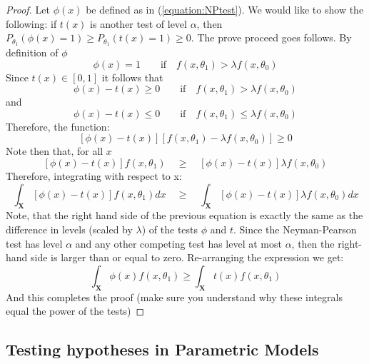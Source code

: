 \documentclass[11pt]{article} %
\begin{document}
\begin{proof}
Let $\phi(x)$ be defined as in (\ref{equation:NPtest}). We would like to show the following: if $t(x)$ is another test of level $\alpha$, then $P_{\theta_1} (\phi(x)=1) \geq P_{\theta_1} (t(x)=1) \geq 0$. The prove proceed goes follows. By definition of $\phi$
\begin{equation*}
\phi(x)=1 \quad\quad \text{if}  \quad f(x, \theta_1) > \lambda f(x, \theta_0)
 \end{equation*} 
Since $t(x) \in [0,1]$ it follows that 
\begin{equation*}
\phi(x) - t(x) \geq 0 \quad\quad \text{if}  \quad f(x, \theta_1) > \lambda f(x, \theta_0)
 \end{equation*} 
 and
 \begin{equation*}
\phi(x) - t(x) \leq 0 \quad\quad \text{if}  \quad f(x, \theta_1) \leq \lambda f(x, \theta_0)
 \end{equation*} 
 Therefore, the function:
 \begin{equation*}
\left[ \phi(x)-t(x) \right] \left[ f(x, \theta_1) - \lambda f(x, \theta_0) \right] \geq 0
 \end{equation*}
 Note then that, for all $x$
 \begin{equation*}
 \left[ \phi(x)-t(x) \right] f(x, \theta_1) \quad \geq  \quad \left[ \phi(x)-t(x) \right] \lambda f(x, \theta_0) 
 \end{equation*}
 Therefore, integrating with respect to x:
  \begin{equation*}
\int_{\mathbf{X}} \left[ \phi(x)-t(x) \right] f(x, \theta_1)dx \quad \geq  \quad \int_{\mathbf{X}}\left[ \phi(x)-t(x) \right] \lambda f(x, \theta_0) dx
 \end{equation*}
 Note, that the right hand side of the previous equation is exactly the same as the difference in levels (scaled by $\lambda$) of the tests $\phi$ and $t$. Since the Neyman-Pearson test has level $\alpha$ and any other competing test has level at most $\alpha$, then the right-hand side is larger than or equal to zero.  Re-arranging the expression we get:
 \begin{equation*}
 \int_{\mathbf{X}} \phi(x) f(x, \theta_1) \geq  \int_{\mathbf{X}} t(x) f(x, \theta_1)
 \end{equation*}
 And this completes the proof (make sure you understand why these integrals equal the power of the tests)
\end{proof}

\subsection{Testing hypotheses in Parametric Models}
\end{document}
